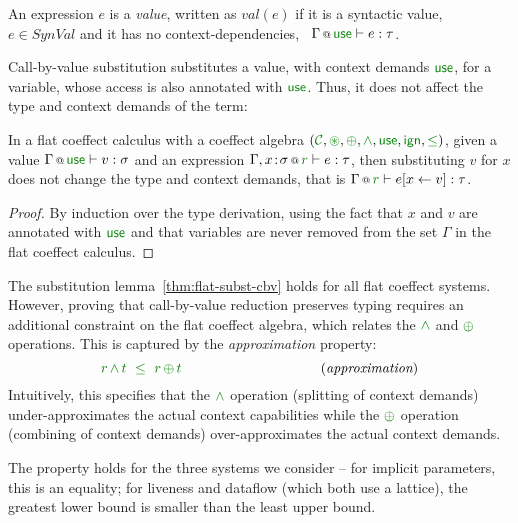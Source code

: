 \begin{definition}
An expression $e$ is a \emph{value}, written as $\textit{val}(e)$ if it is a syntactic value,
\ie~$e \in \mathit{SynVal}$ and it has no context-dependencies, \ie~$\coctx{\Gamma}{ \cunit } \vdash e : \tau$.
\end{definition}

\noindent
Call-by-value substitution substitutes a value, with context demands $\cunit$, for a
variable, whose access is also annotated with $\cunit$. Thus, it does not affect the type and
context demands of the term:

\begin{lemma}
\label{thm:flat-subst-cbv}
In a flat coeffect calculus with a coeffect algebra $(\C, \cseq, \cpar, \czip, \cunit, \czero, \cleq)$,
given a value $\coctx{\Gamma}{\cunit} \vdash v : \sigma$ and an expression
$\coctx{\Gamma,  x\!:\!\sigma}{ \cclrd{r}  } \vdash e : \tau$, then substituting $v$ for $x$ does not
change the type and context demands, that is $\coctx{\Gamma}{ \cclrd{r} } \vdash \subst{e}{x}{v} : \tau$.
\end{lemma}
\begin{proof}
By induction over the type derivation, using the fact that $x$ and $v$ are annotated
with $\cunit$ and that variables are never removed from the set $\Gamma$ in the flat coeffect
calculus.
\end{proof}

\noindent
The substitution lemma~\ref{thm:flat-subst-cbv} holds for all flat coeffect systems. However,
proving that call-by-value reduction preserves typing requires an additional constraint on the
flat coeffect algebra, which relates the $\czip$ and $\cpar$ operations. This is captured
by the \emph{approximation} property:
%
\begin{equation*}
\cclrd{r}\,\czip\,\cclrd{t}~\;\cleq~\;\cclrd{r}\,\cpar\,\cclrd{t}
\hspace{10em}(\textit{approximation})
\end{equation*}
%
Intuitively, this specifies that the $\czip$ operation (splitting of context demands)
under-approximates the actual context capabilities while the $\cpar$ operation (combining of
context demands) over-approximates the actual context demands.

The property holds for the three systems we consider -- for implicit parameters, this is
an equality; for liveness and dataflow (which both use a lattice), the greatest lower bound
is smaller than the least upper bound.

